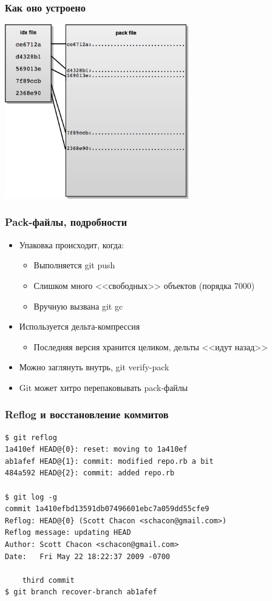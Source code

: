 \documentclass{../text-style}
\begin{document}
    \begin{frame}
        \frametitle{Как оно устроено}
        \begin{center}
            \includegraphics[width=0.6\textwidth]{gitPackFiles.png}
        \end{center}
    \end{frame}

    \begin{frame}
        \frametitle{Pack-файлы, подробности}
        \begin{itemize}
            \item Упаковка происходит, когда:
            \begin{itemize}
                \item Выполняется git push
                \item Слишком много <<свободных>> объектов (порядка 7000)
                \item Вручную вызвана git gc
            \end{itemize}
            \item Используется дельта-компрессия
            \begin{itemize}
                \item Последняя версия хранится целиком, дельты <<идут назад>>
            \end{itemize}
            \item Можно заглянуть внутрь, git verify-pack
            \item Git может хитро перепаковывать pack-файлы
        \end{itemize}
    \end{frame}

    \begin{frame}[fragile]
        \frametitle{Reflog и восстановление коммитов}
            \begin{verbatim}
$ git reflog
1a410ef HEAD@{0}: reset: moving to 1a410ef
ab1afef HEAD@{1}: commit: modified repo.rb a bit
484a592 HEAD@{2}: commit: added repo.rb

$ git log -g
commit 1a410efbd13591db07496601ebc7a059dd55cfe9
Reflog: HEAD@{0} (Scott Chacon <schacon@gmail.com>)
Reflog message: updating HEAD
Author: Scott Chacon <schacon@gmail.com>
Date:   Fri May 22 18:22:37 2009 -0700

    third commit
$ git branch recover-branch ab1afef
            \end{verbatim}
    \end{frame}
\end{document}
